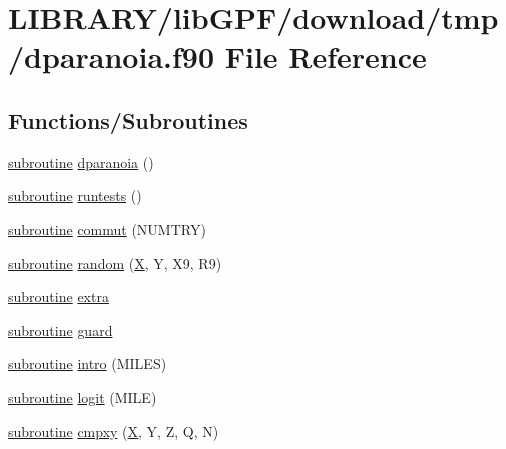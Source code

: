 \hypertarget{dparanoia_8f90}{}\section{L\+I\+B\+R\+A\+R\+Y/lib\+G\+P\+F/download/tmp/dparanoia.f90 File Reference}
\label{dparanoia_8f90}
\subsection*{Functions/\+Subroutines}
\begin{DoxyCompactItemize}
\item 
\hyperlink{M__stopwatch_83_8txt_acfbcff50169d691ff02d4a123ed70482}{subroutine} \hyperlink{dparanoia_8f90_aea61249b658024bcb8b5812d70a64b93}{dparanoia} ()
\item 
\hyperlink{M__stopwatch_83_8txt_acfbcff50169d691ff02d4a123ed70482}{subroutine} \hyperlink{dparanoia_8f90_a210778c94f0b539462736c5c6867e960}{runtests} ()
\item 
\hyperlink{M__stopwatch_83_8txt_acfbcff50169d691ff02d4a123ed70482}{subroutine} \hyperlink{dparanoia_8f90_ae7890d0a663dc609947497ee29d7b921}{commut} (N\+U\+M\+T\+RY)
\item 
\hyperlink{M__stopwatch_83_8txt_acfbcff50169d691ff02d4a123ed70482}{subroutine} \hyperlink{dparanoia_8f90_ad92575b76d7d716ba86718803093a1dc}{random} (\hyperlink{intro__blas1_83_8txt_ac8596739bc875e90fe6e2ecf98e87906}{X}, Y, X9, R9)
\item 
\hyperlink{M__stopwatch_83_8txt_acfbcff50169d691ff02d4a123ed70482}{subroutine} \hyperlink{dparanoia_8f90_a8b0cecca050456b522805e7a3ebe3398}{extra}
\item 
\hyperlink{M__stopwatch_83_8txt_acfbcff50169d691ff02d4a123ed70482}{subroutine} \hyperlink{dparanoia_8f90_a50f1e7cdd1eb06f040fb16cc2e7c65e7}{guard}
\item 
\hyperlink{M__stopwatch_83_8txt_acfbcff50169d691ff02d4a123ed70482}{subroutine} \hyperlink{dparanoia_8f90_a9116036ac9f8a3d17b60a83da0f1657e}{intro} (M\+I\+L\+ES)
\item 
\hyperlink{M__stopwatch_83_8txt_acfbcff50169d691ff02d4a123ed70482}{subroutine} \hyperlink{dparanoia_8f90_a6de1ce1dafc6660e6e63be69dfff7d05}{logit} (M\+I\+LE)
\item 
\hyperlink{M__stopwatch_83_8txt_acfbcff50169d691ff02d4a123ed70482}{subroutine} \hyperlink{dparanoia_8f90_a143ab8d599568d2afcca2aa81370b990}{cmpxy} (\hyperlink{intro__blas1_83_8txt_ac8596739bc875e90fe6e2ecf98e87906}{X}, Y, Z, Q, N)

\end{DoxyCompactItemize}
